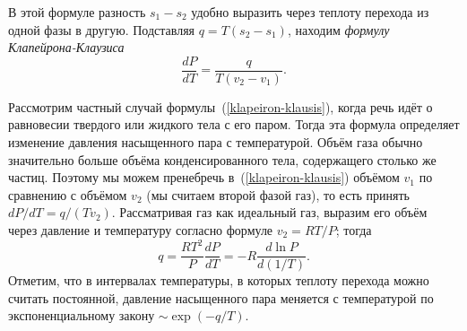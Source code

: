 \documentclass[a4paper,12pt]{article} %
\begin{document}
	В этой формуле разность $s_1 - s_2$ удобно выразить через теплоту перехода из одной фазы в другую. Подставляя $q = T(s_2 - s_1)$, находим \textit{формулу Клапейрона-Клаузиса}
\begin{equation}
	\label{klapeiron-klausis}
	\frac{dP}{dT} = \frac{q}{T(v_2 - v_1)}.
\end{equation}

	Рассмотрим частный случай формулы~(\ref{klapeiron-klausis}), когда речь идёт о равновесии твердого или жидкого тела с его паром. Тогда эта формула определяет изменение давления насыщенного пара с температурой. Объём газа обычно значительно больше объёма конденсированного тела, содержащего столько же частиц. Поэтому мы можем пренебречь в~(\ref{klapeiron-klausis}) объёмом $v_1$ по сравнению с объёмом $v_2$ (мы считаем второй фазой газ), то есть принять $dP/dT = q/(Tv_2)$. Рассматривая газ как идеальный газ, выразим его объём через давление и температуру согласно формуле $v_2 = RT/P$; тогда
\begin{equation}
	\label{teplota}
	q = \frac{RT^2}{P} \frac{dP}{dT} = -R \frac{d\ln P}{d(1/T)}.
\end{equation}
Отметим, что в интервалах температуры, в которых теплоту перехода можно считать постоянной, давление насыщенного пара меняется с температурой по экспоненциальному закону $\sim \exp {(-q / T)}$.
	
\end{document}
